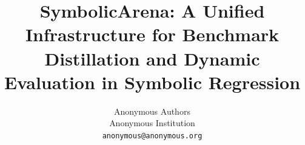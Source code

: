 \documentclass{article}
\title{SymbolicArena: A Unified Infrastructure for Benchmark Distillation and Dynamic Evaluation in Symbolic Regression}
\author{%
  Anonymous Authors \\
  Anonymous Institution \\
  \texttt{anonymous@anonymous.org}
}
\begin{document}
\maketitle



% 














\newpage
\appendix
\setcounter{figure}{0}
\renewcommand{\thefigure}{A.\arabic{figure}}
\renewcommand{\theHfigure}{appendix.\arabic{figure}}


\clearpage
\setcounter{figure}{0}
\renewcommand{\thefigure}{B.\arabic{figure}}
\renewcommand{\theHfigure}{appendixB.\arabic{figure}}


\clearpage
\setcounter{figure}{0}
\renewcommand{\thefigure}{C.\arabic{figure}}
\renewcommand{\theHfigure}{appendixC.\arabic{figure}}


\clearpage
\setcounter{figure}{0}
\renewcommand{\thefigure}{D.\arabic{figure}}
\renewcommand{\theHfigure}{appendixC1.\arabic{figure}}


\clearpage
\setcounter{figure}{0}
\renewcommand{\thefigure}{D.\arabic{figure}}
\renewcommand{\theHfigure}{appendixD.\arabic{figure}}


\clearpage
\setcounter{figure}{0}
\renewcommand{\thefigure}{E.\arabic{figure}}
\renewcommand{\theHfigure}{appendixE.\arabic{figure}}


\clearpage
\setcounter{figure}{0}
\renewcommand{\thefigure}{F.\arabic{figure}}
\renewcommand{\theHfigure}{appendixF.\arabic{figure}}


\clearpage
\setcounter{figure}{0}
\renewcommand{\thefigure}{G.\arabic{figure}}
\renewcommand{\theHfigure}{appendixG.\arabic{figure}}


\clearpage

\end{document}
